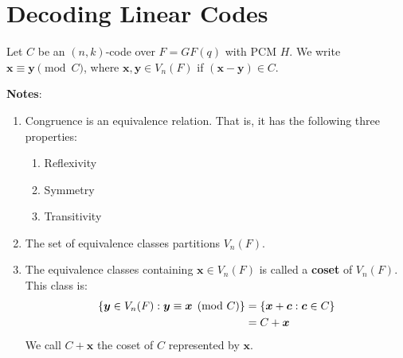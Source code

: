 \section{Decoding Linear Codes}

\begin{Definition}{}{}
    Let $ C $ be an $ (n,k) $-code over $ F=GF(q) $ with PCM $ H $.
    We write $ \bm{x}\equiv \bm{y} \pmod{C} $, where $ \bm{x},\bm{y}\in V_n(F) $
    if $ (\bm{x}-\bm{y})\in C $.
\end{Definition}

\textbf{Notes}:
\begin{enumerate}[label=(\arabic*)]
    \item Congruence is an equivalence relation. That is, it has the
          following three properties:
          \begin{enumerate}[label=(\roman*)]
              \item Reflexivity
              \item Symmetry
              \item Transitivity
          \end{enumerate}
    \item The set of equivalence classes partitions $ V_n(F) $.
    \item The equivalence classes containing $ \bm{x}\in V_n(F) $
          is called a \textbf{coset} of $ V_n(F) $. This class is:
          \begin{align*}
              \{\bm{y}\in V_n(F):\bm{y}\equiv \bm{x}\pmod{C}\}
               & =\{\bm{x}+\bm{c}:\bm{c}\in C\} \\
               & =C+\bm{x}
          \end{align*}
          We call $ C+\bm{x} $ the coset of $ C $ represented by $ \bm{x} $.
\end{enumerate}

